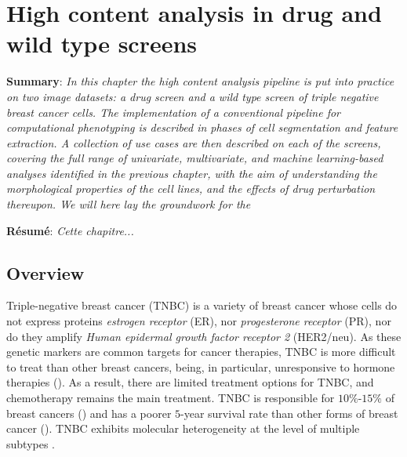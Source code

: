 
\chapter{High content analysis in drug and wild type screens} %
\label{Chapter3} %


\textbf{Summary}: \emph{In this chapter the high content analysis pipeline is put into practice on two image datasets: a drug screen and a wild type screen of triple negative breast cancer cells. The implementation of a conventional pipeline for computational phenotyping is described in phases of cell segmentation and feature extraction. A collection of use cases are then described on each of the screens, covering the full range of univariate, multivariate, and machine learning-based analyses identified in the previous chapter, with the aim of understanding the morphological properties of the cell lines, and the effects of drug perturbation thereupon. We will here lay the groundwork for the }

\textbf{R\'esum\'e}: \emph{Cette chapitre...}

\section{Overview}

Triple-negative breast cancer (TNBC) is a variety of breast cancer whose cells do not express proteins \emph{estrogen receptor} (ER), nor \emph{progesterone receptor} (PR), nor do they amplify \emph{Human epidermal growth factor receptor 2} (HER2/neu). As these genetic markers are common targets for cancer therapies, TNBC is more difficult to treat than other breast cancers, being, in particular, unresponsive to hormone therapies (\cite{hudis2011triple}). As a result, there are limited treatment options for TNBC, and chemotherapy remains the main treatment. TNBC is responsible for $10\%$-$15\%$ of breast cancers (\cite{chavez2010triple}) and has a poorer $5$-year survival rate than other forms of breast cancer (\cite{gonccalves2018survival}). TNBC exhibits molecular heterogeneity at the level of multiple subtypes \cite{hatem2016targeting}.

